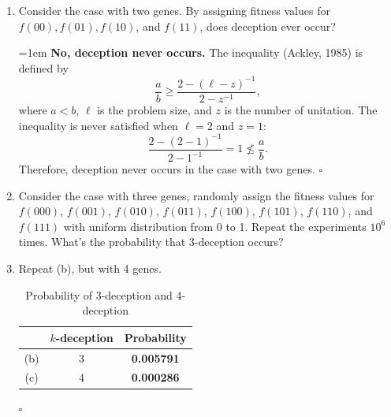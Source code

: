 \documentclass{article}
\begin{document}
\begin{enumerate}[label=(\alph*)]
      \item 
      Consider the case with two genes. 
      By assigning fitness values for $f(00), f(01), f(10)$, and $f(11)$, 
      does deception ever occur?

      \vspace{0.5em}

            \parindent=1em
            \textbf{No, deception never occurs.}
            The inequality (Ackley, 1985) is defined by 
            \begin{equation*}
                  \frac{a}{b} \geq \frac{2 - (\ell - z)^{-1}}{2 - z^{-1}},
            \end{equation*}
            where $a < b$, $\ell$ is the problem size, and $z$ is the number of unitation.
            The inequality is never satisfied when $\ell = 2$ and $z = 1$:
            \begin{equation*}
                  \frac{2 - (2 - 1)^{-1}}{2 - 1^{-1}} = 1 \not\leq \frac{a}{b}.
            \end{equation*}
            Therefore, deception never occurs in the case with two genes. \hfill $\square$

      \vspace{1em}

      \item
      \label{item:1b}
      Consider the case with three genes, randomly assign the fitness values 
      for $f(000)$, $f(001)$, $f(010)$, $f(011)$, $f(100)$, $f(101)$, $f(110)$, and $f(111)$ 
      with uniform distribution from 0 to 1. Repeat the experiments $10^6$ times. 
      What’s the probability that 3-deception occurs?

      \item
      Repeat (b), but with 4 genes.

            \begin{table}[h]
                  \setlength{\tabcolsep}{2em}
                  \renewcommand{\arraystretch}{1.3}
                  \centering
                  \begin{tabular}{ccc}
                        \hline
                         & $k$-deception & Probability \\
                        \hline
                        (b) & 3 & \textbf{0.005791} \\
                        (c) & 4 & \textbf{0.000286} \\
                        \hline
                  \end{tabular}
                  \caption{Probability of 3-deception and 4-deception}
            \end{table}
            \hfill $\square$




\end{enumerate}
\end{document}
